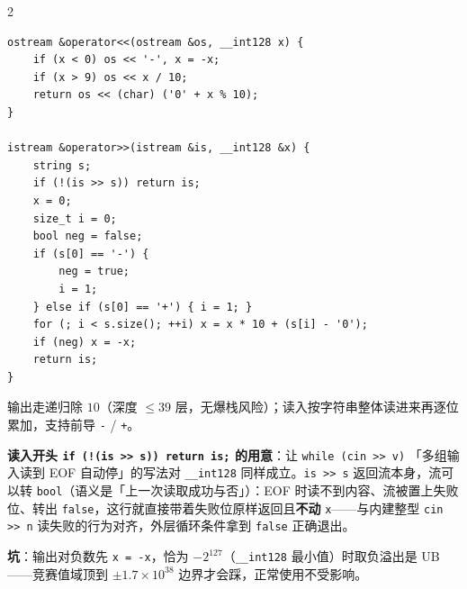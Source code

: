 \begin{multicols*}{2}
		\begin{verbatim}
ostream &operator<<(ostream &os, __int128 x) {
	if (x < 0) os << '-', x = -x;
	if (x > 9) os << x / 10;
	return os << (char) ('0' + x % 10);
}

istream &operator>>(istream &is, __int128 &x) {
	string s;
	if (!(is >> s)) return is;
	x = 0;
	size_t i = 0;
	bool neg = false;
	if (s[0] == '-') {
		neg = true;
		i = 1;
	} else if (s[0] == '+') { i = 1; }
	for (; i < s.size(); ++i) x = x * 10 + (s[i] - '0');
	if (neg) x = -x;
	return is;
}
		\end{verbatim}

		输出走递归除 $10$（深度 $\le 39$ 层，无爆栈风险）；读入按字符串整体读进来再逐位累加，支持前导 \texttt{-} / \texttt{+}。

		\textbf{读入开头 \texttt{if (!(is >> s)) return is;} 的用意}：让 \texttt{while (cin >> v)} 「多组输入读到 EOF 自动停」的写法对 \texttt{\_\_int128} 同样成立。\texttt{is >> s} 返回流本身，流可以转 \texttt{bool}（语义是「上一次读取成功与否」）：EOF 时读不到内容、流被置上失败位、转出 \texttt{false}，这行就直接带着失败位原样返回且\textbf{不动} \texttt{x}——与内建整型 \texttt{cin >> n} 读失败的行为对齐，外层循环条件拿到 \texttt{false} 正确退出。

		\textbf{坑}：输出对负数先 \texttt{x = -x}，恰为 $-2^{127}$（\texttt{\_\_int128} 最小值）时取负溢出是 UB——竞赛值域顶到 $\pm 1.7 \times 10^{38}$ 边界才会踩，正常使用不受影响。
	\end{multicols*}

